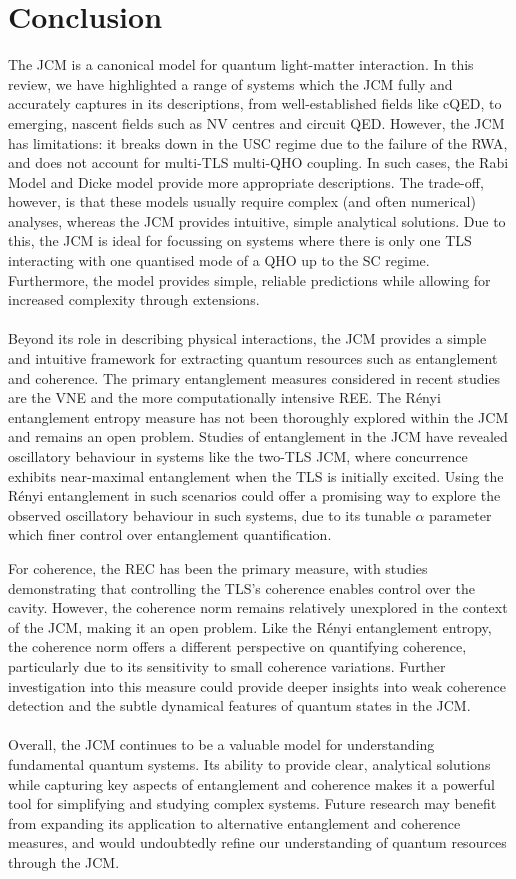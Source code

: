 \documentclass[12pt,a4paper]{article}
\begin{document}
\section{Conclusion} \label{sec_Conclusion}

The JCM is a canonical model for quantum light-matter interaction. In this review, we have highlighted a range of systems which the JCM fully and accurately captures in its descriptions, from well-established fields like cQED, to emerging, nascent fields such as NV centres and circuit QED. However, the JCM has limitations: it breaks down in the USC regime due to the failure of the RWA, and does not account for multi-TLS multi-QHO coupling. In such cases, the Rabi Model and Dicke model provide more appropriate descriptions. The trade-off, however, is that these models usually require complex (and often numerical) analyses, whereas the JCM provides intuitive, simple analytical solutions. Due to this, the JCM is ideal for focussing on systems where there is only one TLS interacting with one quantised mode of a QHO up to the SC regime. Furthermore, the model provides simple, reliable predictions while allowing for increased complexity through extensions.\\
\\
Beyond its role in describing physical interactions, the JCM provides a simple and intuitive framework for extracting quantum resources such as entanglement and coherence. The primary entanglement measures considered in recent studies are the VNE and the more computationally intensive REE. The R\'enyi entanglement entropy measure has not been thoroughly explored within the JCM and remains an open problem. Studies of entanglement in the JCM have revealed oscillatory behaviour in systems like the two-TLS JCM, where concurrence exhibits near-maximal entanglement when the TLS is initially excited. Using the R\'enyi entanglement in such scenarios could offer a promising way to explore the observed oscillatory behaviour in such systems, due to its tunable $\alpha$ parameter which finer control over entanglement quantification.

For coherence, the REC has been the primary measure, with studies demonstrating that controlling the TLS's coherence enables control over the cavity. However, the coherence norm remains relatively unexplored in the context of the JCM, making it an open problem. Like the R\'enyi entanglement entropy, the coherence norm offers a different perspective on quantifying coherence, particularly due to its sensitivity to small coherence variations. Further investigation into this measure could provide deeper insights into weak coherence detection and the subtle dynamical features of quantum states in the JCM.\\
\\
Overall, the JCM continues to be a valuable model for understanding fundamental quantum systems. Its ability to provide clear, analytical solutions while capturing key aspects of entanglement and coherence makes it a powerful tool for simplifying and studying complex systems. Future research may benefit from expanding its application to alternative entanglement and coherence measures, and would undoubtedly refine our understanding of quantum resources through the JCM.
\end{document}
